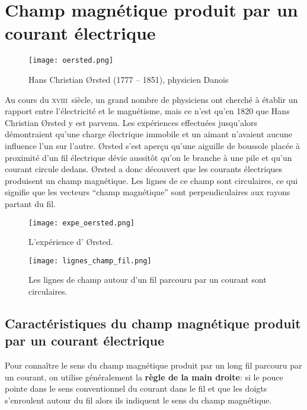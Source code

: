 \section{Champ magnétique produit par un courant électrique}
\begin{wrapfigure}[13]{l}{0.3\textwidth}
    \vspace{-\baselineskip}
    \texttt{[image: oersted.png]}
    \caption{Hans Christian {\O}rsted (1777 -- 1851), physicien Danois}
    \label{oersted}
\end{wrapfigure}
Au cours du \textsc{xviii}\ieme~siècle, un grand nombre de physiciens ont cherché à établir un rapport entre l'électricité et le magnétisme, mais ce n'est qu'en 1820 que Hans Christian {\O}rsted y est parvenu. Les expériences effectuées jusqu'alors démontraient qu'une charge électrique immobile et un aimant n'avaient aucune influence l'un sur l'autre.
{\O}rsted s'est aperçu qu'une aiguille de boussole placée à proximité d'un fil électrique dévie aussitôt qu'on le branche à une pile et qu'un courant circule dedans.
    {\O}rsted a donc découvert que les courants électriques produisent un champ magnétique. Les lignes de ce champ sont circulaires, ce qui signifie que les vecteurs \enquote{champ magnétique} sont perpendiculaires aux rayons partant du fil.

\begin{figure}[!ht]
    \centering
    \begin{minipage}[b]{.47\linewidth}
        \centering
        \texttt{[image: expe\_oersted.png]}
        \caption{L'expérience d' {\O}rsted.}
        \label{expe_oersted}
    \end{minipage}
    \begin{minipage}[b]{.47\linewidth}
        \centering
        \texttt{[image: lignes\_champ\_fil.png]}
        \caption{Les lignes de champ autour d'un fil parcouru par un courant sont circulaires.}
        \label{lignes_champ_fil}
    \end{minipage}
\end{figure}

\newpage

\subsection{Caractéristiques du champ magnétique produit par un courant électrique}
Pour connaître le sens du champ magnétique produit par un long fil parcouru par un courant, on utilise généralement la \textbf{règle de la main droite}: si le pouce pointe dans le sens conventionnel du courant dans le fil et que les doigts s'enroulent autour du fil alors ils indiquent le sens du champ magnétique.

